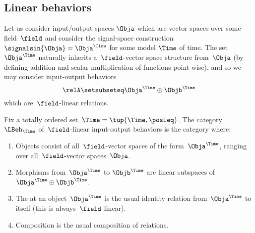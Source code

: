 



\subsection{Linear behaviors}

Let us consider input/output spaces $\Obja$ which are vector spaces over some field~$\field$ and consider the signal-space construction $\signalsin{\Obja} = \Obja^\Time$ for some model $\Time$ of time.
The set $\Obja^\Time$ naturally inherits a~$\field$-vector space structure from~$\Obja$ (by defining addition and scalar multiplication of functions point wise), and so we may consider input-output behaviors
\begin{equation}
    \relA \setsubseteq \Obja^\Time \oplus \Objb^\Time
\end{equation}
which are~$\field$-linear relations.

\begin{definition}\label{def:linear-io-behavior}
    Fix a totally ordered set~$\Time = \tup{\Time, \posleq}$.
    The category~$\LBeh_\Time$ of~$\field$-linear input-output behaviors is the category where:
    \begin{enumerate}
        \item Objects consist of all~$\field$-vector spaces of the form~$\Obja^\Time$, ranging over all~$\field$-vector spaces~$\Obja$.
        \item Morphisms from~$\Obja^\Time$ to $\Objb^\Time$ are linear subspaces of~$\Obja^\Time \oplus \Objb^\Time$.
        \item The  at an object~$\Obja^\Time$ is the usual identity relation from~$\Obja^\Time$ to itself (this is always~$\field$-linear).
        \item Composition is the usual composition of relations.
    \end{enumerate}
\end{definition}

